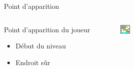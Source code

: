 \documentclass{beamer}
\begin{document}
{\begin{frame}{Point d'apparition}
    \begin{columns}
        \begin{block}{Point d'apparition du joueur}
            \begin{itemize}
                \item[\bullet] Début du niveau
                \item[\bullet] Endroit sûr
            \end{itemize}
        \end{block}
        \begin{figure}
            \centering
            \includegraphics[width=1.0\textwidth]{valid_spawn_locations}
        \end{figure}
    \end{columns}
\end{frame}

}
\end{document}
